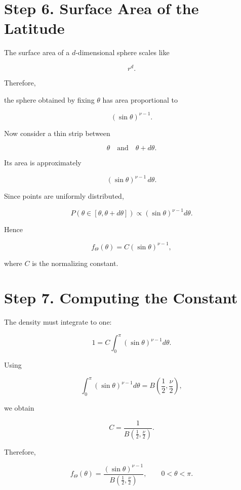 \documentclass[11pt]{article}
\begin{document}
	\section{Step 6. Surface Area of the Latitude}
	
	The surface area of a $d$-dimensional sphere scales like
	
	\[
	r^d.
	\]
	
	Therefore,
	
	the sphere obtained by fixing $\theta$ has area proportional to
	
	\[
	(\sin\theta)^{\nu-1}.
	\]
	
	Now consider a thin strip between
	
	\[
	\theta
	\quad\text{and}\quad
	\theta+d\theta.
	\]
	
	Its area is approximately
	
	\[
	(\sin\theta)^{\nu-1}
	\,d\theta.
	\]
	
	Since points are uniformly distributed,
	
	\[
	P(\theta\in[\theta,\theta+d\theta])
	\propto
	(\sin\theta)^{\nu-1}
	d\theta.
	\]
	
	Hence
	
	\[
	f_\Theta(\theta)
	=
	C
	(\sin\theta)^{\nu-1},
	\]
	
	where $C$ is the normalizing constant.
	
	
	\section{Step 7. Computing the Constant}
	
	The density must integrate to one:
	
	\[
	1
	=
	C
	\int_0^\pi
	(\sin\theta)^{\nu-1}
	d\theta.
	\]
	
	Using
	
	\[
	\int_0^\pi
	(\sin\theta)^{\nu-1}
	d\theta
	=
	B
	\left(
	\frac12,
	\frac{\nu}{2}
	\right),
	\]
	
	we obtain
	
	\[
	C
	=
	\frac1{
		B\left(\frac12,\frac\nu2\right)
	}.
	\]
	
	Therefore,
	
	\[
	\boxed{
		f_\Theta(\theta)
		=
		\frac{
			(\sin\theta)^{\nu-1}
		}{
			B\left(\frac12,\frac\nu2\right)
		},
		\qquad
		0<\theta<\pi.
	}
	\]
	
	
\end{document}
